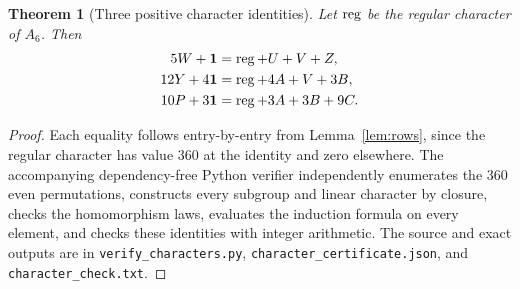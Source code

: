 \documentclass[11pt,letterpaper]{article}
\newtheorem{theorem}{Theorem}[section]
\theoremstyle{remark}\newtheorem{remark}[theorem]{Remark}
\newcommand{\code}[1]{\nolinkurl{#1}}
\begin{document}
\begin{theorem}[Three positive character identities]\label{thm:identities}
Let $\operatorname{reg}$ be the regular character of $A_6$. Then
\begin{align}
 5W+\mathbf1&=\operatorname{reg}+U+V+Z,\label{eq:W}\\
 12Y+4\mathbf1&=\operatorname{reg}+4A+V+3B,\label{eq:Y}\\
 10P+3\mathbf1&=\operatorname{reg}+3A+3B+9C.\label{eq:P}
\end{align}
\end{theorem}
\begin{proof}
Each equality follows entry-by-entry from Lemma~\ref{lem:rows}, since the regular character has value 360 at the identity and zero elsewhere. The accompanying dependency-free Python verifier independently enumerates the 360 even permutations, constructs every subgroup and linear character by closure, checks the homomorphism laws, evaluates the induction formula on every element, and checks these identities with integer arithmetic. The source and exact outputs are in \code{verify_characters.py}, \code{character_certificate.json}, and \code{character_check.txt}.
\end{proof}
\end{document}
